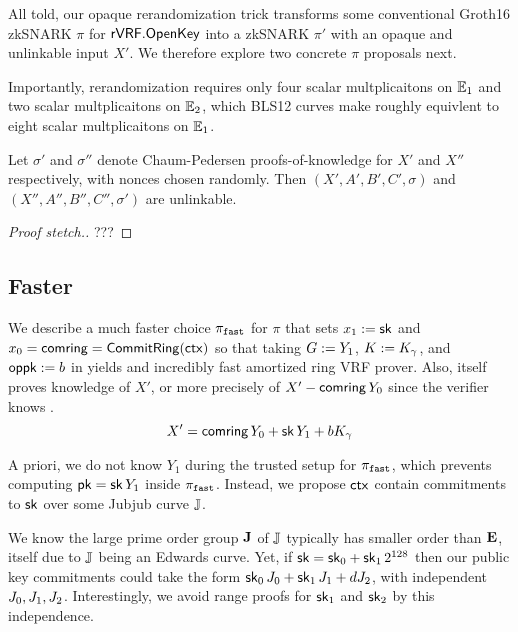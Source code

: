 All told, our opaque rerandomization trick transforms some conventional
Groth16 zkSNARK $\pi$ for ${\mathsf{rVRF}}.{\mathsf{OpenKey}}$ into
 a zkSNARK $\pi'$ with an opaque and unlinkable input $X'$.
We therefore explore two concrete $\pi$ proposals next.

Importantly, rerandomization requires only
 four scalar multplicaitons on ${\mathbb{E}}_1$ and
 two scalar multplicaitons on ${\mathbb{E}}_2$,
which  BLS12 curves make roughly equivlent to
 eight scalar multplicaitons on ${\mathbb{E}}_1$.


\begin{proposition}\label{prop:unlinkable}
Let $\sigma'$ and $\sigma''$ denote Chaum-Pedersen proofs-of-knowledge
 for $X'$ and $X''$ respectively, with nonces chosen randomly.
Then $(X',A',B',C',\sigma)$ and $(X'',A'',B'',C'',\sigma')$ are unlinkable.
\end{proposition}

\begin{proof}[Proof stetch.]
???
\end{proof}


\subsection{Faster}
\label{subsec:rvrf_faster}

We describe a much faster choice $\pi_{\mathtt{fast}}$ for $\pi$
that sets $x_1 := \mathsf{sk}$ and $x_0 = \mathsf{comring} = {\mathsf{CommitRing}}(\mathsf{ctx})$ so that
taking $G := Y_1$, $K := K_\gamma$, and $\mathsf{oppk} := b$ in \PedVRF
yields and incredibly fast amortized ring VRF prover.
Also, \PedVRF itself proves knowledge of $X'$,
 or more precisely of $X' - \mathsf{comring}\, Y_0$ since the verifier knows \comring.
$$ X' = \mathsf{comring}\, Y_0 + \mathsf{sk}\, Y_1 + b K_\gamma $$


A priori, we do not know $Y_1$ during the trusted setup for $\pi_{\mathtt{fast}}$,
which prevents computing $\mathsf{pk} = \mathsf{sk}\, Y_1$ inside $\pi_{\mathtt{fast}}$.
Instead, we propose $\mathsf{ctx}$ contain commitments to $\mathsf{sk}$ over
some Jubjub curve ${\mathbb{J}}$.  

We know the large prime order group ${\mathbf{J}}$ of ${\mathbb{J}}$ typically has
smaller order than ${\mathbf{E}}$, itself due to ${\mathbb{J}}$ being an Edwards curve. 
Yet, if $\mathsf{sk} = \mathsf{sk}_0 + \mathsf{sk}_1 \, 2^{128}$ then our public key commitments could
take the form $\mathsf{sk}_0\, J_0 + \mathsf{sk}_1\, J_1 + d J_2$,
with independent $J_0,J_1,J_2$.
Interestingly, we avoid range proofs for $\mathsf{sk}_1$ and $\mathsf{sk}_2$
by this independence. 

